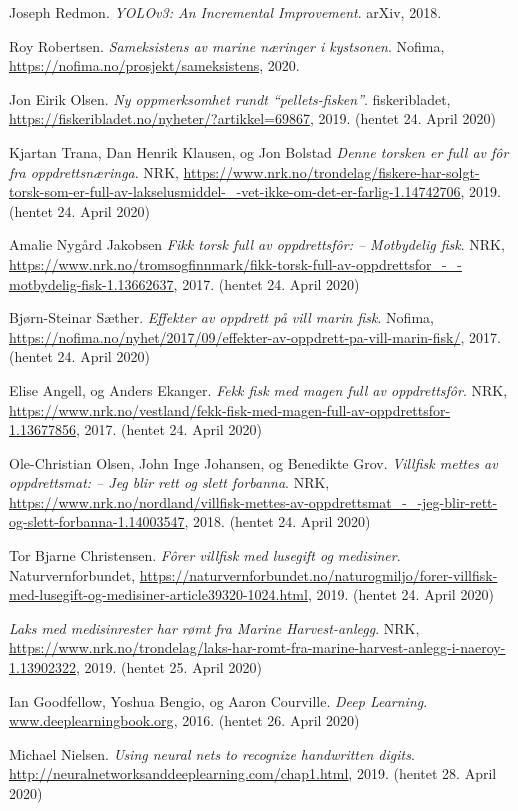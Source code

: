 \documentclass[11ot]{article}
\begin{document}
\begin{thebibliography}{9}
Joseph Redmon. 
\textit{YOLOv3: An Incremental Improvement}. 
arXiv, 2018.

Roy Robertsen. 
\textit{Sameksistens av marine næringer i kystsonen}. 
Nofima, \url{https://nofima.no/prosjekt/sameksistens}, 2020.

Jon Eirik Olsen. 
\textit{Ny oppmerksomhet rundt “pellets-fisken”}. 
fiskeribladet, \url{https://fiskeribladet.no/nyheter/?artikkel=69867}, 2019. (hentet 24. April 2020)

Kjartan Trana, Dan Henrik Klausen, og Jon Bolstad 
\textit{Denne torsken er full av fôr fra oppdrettsnæringa}. 
NRK, \url{https://www.nrk.no/trondelag/fiskere-har-solgt-torsk-som-er-full-av-lakselusmiddel-_-vet-ikke-om-det-er-farlig-1.14742706}, 2019. (hentet 24. April 2020)

 Amalie Nygård Jakobsen
\textit{Fikk torsk full av oppdrettsfôr: – Motbydelig fisk}. 
NRK, \url{https://www.nrk.no/tromsogfinnmark/fikk-torsk-full-av-oppdrettsfor_-_-motbydelig-fisk-1.13662637}, 2017. (hentet 24. April 2020)

Bjørn-Steinar Sæther. 
\textit{Effekter av oppdrett på vill marin fisk}. 
Nofima, \url{https://nofima.no/nyhet/2017/09/effekter-av-oppdrett-pa-vill-marin-fisk/}, 2017. (hentet 24. April 2020)

Elise Angell, og Anders Ekanger. 
\textit{Fekk fisk med magen full av oppdrettsfôr}. 
NRK, \url{https://www.nrk.no/vestland/fekk-fisk-med-magen-full-av-oppdrettsfor-1.13677856}, 2017. (hentet 24. April 2020)

Ole-Christian Olsen, John Inge Johansen, og Benedikte Grov. 
\textit{Villfisk mettes av oppdrettsmat: – Jeg blir rett og slett forbanna}. 
NRK, \url{https://www.nrk.no/nordland/villfisk-mettes-av-oppdrettsmat_-_-jeg-blir-rett-og-slett-forbanna-1.14003547}, 2018. (hentet 24. April 2020)

Tor Bjarne Christensen. 
\textit{Fôrer villfisk med lusegift og medisiner}. 
Naturvernforbundet, \url{https://naturvernforbundet.no/naturogmiljo/forer-villfisk-med-lusegift-og-medisiner-article39320-1024.html}, 2019. (hentet 24. April 2020)

\textit{Laks med medisinrester har rømt fra Marine Harvest-anlegg}. 
NRK, \url{https://www.nrk.no/trondelag/laks-har-romt-fra-marine-harvest-anlegg-i-naeroy-1.13902322}, 2019. (hentet 25. April 2020)

Ian Goodfellow, Yoshua Bengio, og Aaron Courville. 
\textit{Deep Learning}. 
\url{www.deeplearningbook.org}, 2016. (hentet 26. April 2020)

Michael Nielsen. 
\textit{Using neural nets to recognize handwritten digits}. 
\url{http://neuralnetworksanddeeplearning.com/chap1.html}, 2019. (hentet 28. April 2020)

\end{thebibliography}
\end{document}
